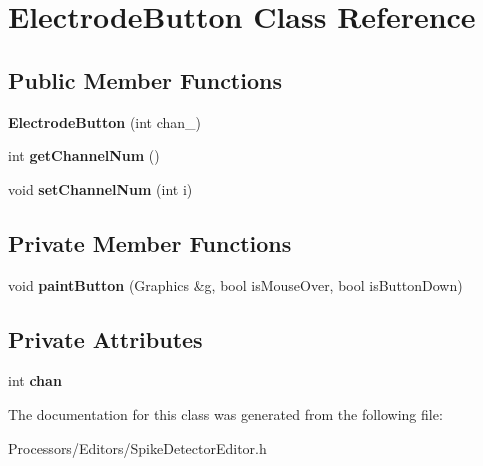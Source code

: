 \hypertarget{classElectrodeButton}{\section{Electrode\-Button Class Reference}
\label{classElectrodeButton}
}
\subsection*{Public Member Functions}
\begin{DoxyCompactItemize}
\item 
\hypertarget{classElectrodeButton_a15999b20ddc88248d2de0bf2e78c5a26}{{\bfseries Electrode\-Button} (int chan\-\_\-)}\label{classElectrodeButton_a15999b20ddc88248d2de0bf2e78c5a26}

\item 
\hypertarget{classElectrodeButton_a1738d6809dd3fe22638a25b23df4e9b1}{int {\bfseries get\-Channel\-Num} ()}\label{classElectrodeButton_a1738d6809dd3fe22638a25b23df4e9b1}

\item 
\hypertarget{classElectrodeButton_af82d6cf490fdce1d729d53d1ec722f13}{void {\bfseries set\-Channel\-Num} (int i)}\label{classElectrodeButton_af82d6cf490fdce1d729d53d1ec722f13}

\end{DoxyCompactItemize}
\subsection*{Private Member Functions}
\begin{DoxyCompactItemize}
\item 
\hypertarget{classElectrodeButton_a4f6f76c9773cf7ef40cdbb8fbb82e938}{void {\bfseries paint\-Button} (Graphics \&g, bool is\-Mouse\-Over, bool is\-Button\-Down)}\label{classElectrodeButton_a4f6f76c9773cf7ef40cdbb8fbb82e938}

\end{DoxyCompactItemize}
\subsection*{Private Attributes}
\begin{DoxyCompactItemize}
\item 
\hypertarget{classElectrodeButton_a0be15afb8675a5cad16d2b1bd13f5648}{int {\bfseries chan}}\label{classElectrodeButton_a0be15afb8675a5cad16d2b1bd13f5648}

\end{DoxyCompactItemize}


The documentation for this class was generated from the following file\-:\begin{DoxyCompactItemize}
\item 
Processors/\-Editors/Spike\-Detector\-Editor.\-h\end{DoxyCompactItemize}
